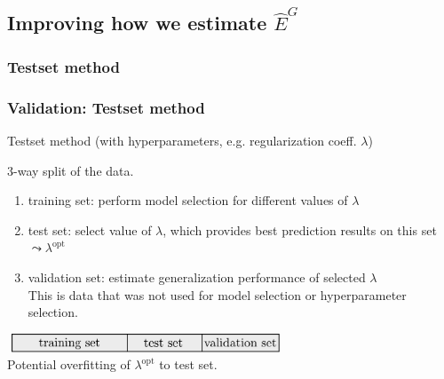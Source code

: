 \newpage

\subsection{Improving how we estimate $\widehat E^G$}

\begin{frame}



\end{frame}


\subsubsection{Testset method}

\begin{frame}\frametitle{Validation: Testset method}
	
	\begin{block}{Testset method (with hyperparameters, e.g. regularization coeff. $\lambda$)}
	
	3-way split of the data.
	
		\begin{enumerate}
		  \item training set: perform model selection for different values of $\lambda$
		  \item test set: select value of $\lambda $, 
		  		which provides best prediction results on this set $\leadsto \lambda^{\mathrm{opt}}$
		  \item validation set: estimate generalization performance of selected $\lambda$\\
		  This is data that was not used for model selection or hyperparameter selection.
		\end{enumerate}
	\end{block}	
	
	\vspace{1cm} 
	
	$ $\hspace{1cm}
	\includegraphics[width=8cm]{img/traintestvalidation.pdf} \\
	
	Potential overfitting of $\lambda^{\mathrm{opt}}$ to test set.
\end{frame}


